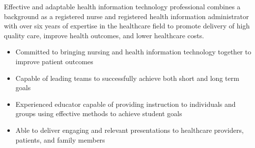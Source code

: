 

\begin{cvparagraph}

Effective and adaptable health information technology professional combines a background as a registered nurse and registered health information administrator with over six years of expertise in the healthcare field to promote delivery of high quality care, improve health outcomes, and lower healthcare costs.
    \begin{itemize}[topsep=0pt,itemsep=0pt,parsep=0pt,partopsep=0pt,leftmargin=4mm]
    \item Committed to bringing nursing and health information technology together to improve patient outcomes    
    \item Capable of leading teams to successfully achieve both short and long term goals
    \item Experienced educator capable of providing instruction to individuals and groups using effective methods to achieve student goals  
    \item Able to deliver engaging and relevant presentations to healthcare providers, patients, and family members
    \end{itemize}
\end{cvparagraph}
